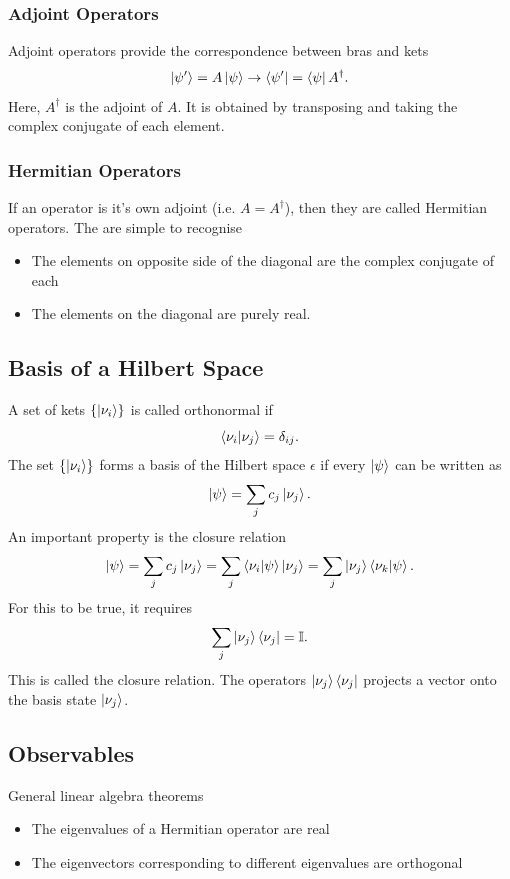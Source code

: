 \documentclass{article}
\begin{document}
\subsubsection{Adjoint Operators}
Adjoint operators provide the correspondence between bras and kets
\[
    \ket{\psi '}=A \ket{\psi }\to \bra{\psi '}=\bra{\psi }A^\dag.
\]
Here, $A^\dag$ is the adjoint of $A$. It is obtained by transposing and taking the complex conjugate of each element.

\subsubsection{Hermitian Operators}
If an operator is it's own adjoint (i.e. $A=A^\dag$), then they are called Hermitian operators. The are simple to recognise
\begin{itemize}
    \item The elements on opposite side of the diagonal are the complex conjugate of each
    \item The elements on the diagonal are purely real.
\end{itemize}

\subsection{Basis of a Hilbert Space}
A set of kets $\left\{ \ket{\nu _i} \right\}$ is called orthonormal if
\[
    \braket{\nu _i}{\nu _j}=\delta _{ij}.
\]
The set $\left\{ \ket{\nu _i} \right\}$ forms a basis of the Hilbert space $\epsilon $ if every $\ket{\psi }$ can be written as
\[
    \ket{\psi }=\sum_{j}c_j \ket{\nu _j}.
\]
An important property is the closure relation
\[
    \ket{\psi }=\sum_{j}c_j \ket{\nu _j}=\sum_{j}\braket{\nu _i}{\psi }\ket{\nu _j}=\sum_{j}\ket{\nu _j}\braket{\nu _k}{\psi }.
\]
For this to be true, it requires
\[
    \sum_{j}\ket{\nu _j}\bra{\nu _j}=\mathbb{I}.
\]
This is called the closure relation. The operators $\ket{\nu _j}\bra{\nu _j}$ projects a vector onto the basis state $\ket{\nu _j}$.

\subsection{Observables}
General linear algebra theorems
\begin{itemize}
    \item The eigenvalues of a Hermitian operator are real
    \item The eigenvectors corresponding to different eigenvalues are orthogonal
\end{itemize}
\end{document}
